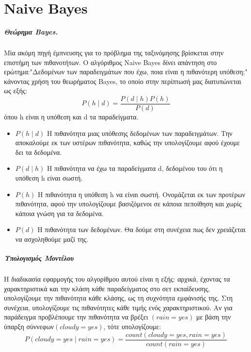 \chapter{Naive Bayes}
\label{appendix:NBayes}
\paragraph{Θεώρημα Bayes.} Μία ακόμη πηγή έμπνευσης για το πρόβλημα της ταξινόμησης βρίσκεται στην επιστήμη των πιθανοτήτων. Ο αλγόριθμος Naive Bayes δίνει απάντηση στο ερώτημα:"Δεδομένων των
παραδειγμάτων που έχω, ποια είναι η πιθανότερη υπόθεση;" κάνοντας χρήση του θεωρήματος Bayes, το οποίο στην περίπτωσή μας διατυπώνεται ως εξής: 
\begin{equation}
P(h \mid d)= \frac{P(d \mid h) P(h)}{P(d)}
\end{equation}
όπου h είναι η υπόθεση και d τα παραδείγματα.

\begin{itemize}
	\item $P(h \mid d)$ Η πιθανότητα μιας υπόθεσης δεδομένων των παραδειγμάτων. Την αποκαλούμε εκ των υστέρων πιθανότητα, καθώς την υπολογίζουμε αφού έχουμε δει τα δεδομένα.
	\item $P(d \mid h)$ Η πιθανότητα να έχω τα παραδείγματα d, δεδομένου του ότι η υπόθεση h είναι σωστή.
	\item $P( h)$ Η πιθανότητα η υπόθεση h να είναι σωστή. Ονομάζεται εκ των προτέρων πιθανότητα, αφού την υπολογίζουμε βασιζόμενοι σε κάποια πεποίθηση και χωρίς κάποια γνώση για τα δεδομένα.
	\item $P(d)$ Η πιθανότητα των δεδομένων. Θα δούμε στη συνέχεια πως δεν χρειάζεται να ασχοληθούμε μαζί της.
\end{itemize}
\paragraph{Υπολογισμός Μοντέλου} Η διαδικασία εφαρμογής του αλγορίθμου αυτού είναι η εξής: αρχικά, έχοντας τα χαρακτηριστικά και την κλάση κάθε παραδείγματος στο σετ εκπαίδευσης, υπολογίζουμε την πιθανότητα κάθε κλάσης, ως τη συχνότητα εμφάνισής της. Στη συνέχεια, υπολογίζουμε τις πιθανότητες κάθε τιμής ενός χαρακτηριστικού. Αν για παράδειγμα προβλέπουμε την πιθανότητα να βρέξει $(rain=yes)$ με βάση την ύπαρξη σύννεφων$(cloudy=yes)$, τότε υπολογίζουμε:
\begin{equation}
P(cloudy= yes \mid rain=yes)= \frac{count(cloudy=yes, rain =yes)}{count(rain=yes)}
\end{equation}
